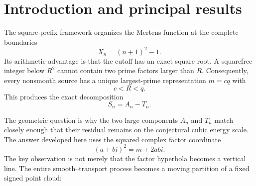 \documentclass[11pt]{article}
\theoremstyle{definition}
\theoremstyle{remark}
\newcommand{\1}{\mathbf{1}}
\begin{document}
\begin{abstract}
The same ordinate $Y=2ab$ controls both spatial clustering and temporal persistence.  For a canonical point in $B_n$, if $|Y|\le H$, then the factor gap $|q-c|$ is at most $H/n$, and for each fixed gap there is at most one product in $B_n$.  Hence
\[
 \#\{m\in B_n:|Y_m|\le H\}
 \le \left\lfloor\frac{H}{n}\right\rfloor,
\]
with no points at all for $|Y_m|\le n$.
For transport points,
\[
 L(m)\le q-\sqrt{cq}
 =\frac{2Y}{q(1+\sqrt{c/q})(1+c/q)}
 \le\frac{2Y}{q}.
\]
At the natural height $H\asymp n$, both block occupancy and transport lifetime are $O(1)$.

Finally, the quadratic map
\[
 \Phi(c,q)=\left(cq,\frac{q^2-c^2}{2}\right)
\]
is conformal: its differential expands both coordinate directions by $\sqrt{c^2+q^2}$ and its Jacobian is
\[
 \det D\Phi=c^2+q^2\ge2cq.
\]
At square scale $cq\asymp n^2$, unit factor-lattice area expands by at least order $n^2$, exactly the two-power dilution required to pass from the coherent $N^5$ ceiling to the cubic $N^3$ scale.  Turning this geometric dilution into a signed high-shell kernel estimate is the remaining analytic step.  The arithmetic decomposition, all coordinate identities, the moving-region partition, the channel telescoping law, the conformal Jacobian, and the low-height clustering and lifetime bounds are unconditional.
\end{abstract}

\tableofcontents
\newpage

\section{Introduction and principal results}
\label{sec:introduction}

The square-prefix framework organizes the Mertens function at the complete boundaries
\[
 X_n=(n+1)^2-1.
\]
Its arithmetic advantage is that the cutoff has an exact square root.  A squarefree integer below $R^2$ cannot contain two prime factors larger than $R$.  Consequently, every nonsmooth source has a unique largest-prime representation $m=cq$ with
\[
 c<R<q.
\]
This produces the exact decomposition
\[
 S_n=A_n-T_n.
\]

The geometric question is why the two large components $A_n$ and $T_n$ match closely enough that their residual remains on the conjectural cubic energy scale.  The answer developed here uses the squared complex factor coordinate
\[
 (a+bi)^2=m+2abi.
\]
The key observation is not merely that the factor hyperbola becomes a vertical line.  The entire smooth--transport process becomes a moving partition of a fixed signed point cloud:
\end{document}
